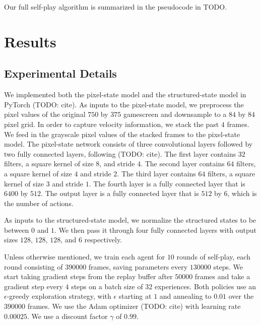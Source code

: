 \documentclass[10pt,twocolumn,letterpaper]{article}
\begin{document}
Our full self-play algorithm is summarized in the pseudocode in TODO.

\section{Results}

\subsection{Experimental Details}
We implemented both the pixel-state model and the structured-state model in
PyTorch (TODO: cite). As inputs to the pixel-state model, we preprocess the
pixel values of the original $750$ by $375$ gamescreen and downsample to a
$84$ by $84$ pixel grid. In order to capture velocity information, we stack
the past $4$ frames. We feed in the grayscale pixel values of the stacked
frames to the pixel-state model. The pixel-state network consists of three
convolutional layers followed by two fully connected layers, following (TODO:
cite). The first layer contains $32$ filters, a square kernel of size $8$, and
stride $4$. The second layer contains $64$ filters, a square kernel of size
$4$ and stride $2$. The third layer contains $64$ filters, a square kernel of
size $3$ and stride $1$. The fourth layer is a fully connected layer that is
$6400$ by $512$. The output layer is a fully connected layer that is $512$ by
$6$, which is the number of actions.

As inputs to the structured-state model, we normalize the structured states to
be between $0$ and $1$. We then pass it through four fully connected layers
with output sizes $128$, $128$, $128$, and $6$ respectively.

Unless otherwise mentioned, we train each agent for $10$ rounds of self-play,
each round consisting of $390000$ frames, saving parameters every $130000$
steps. We start taking gradient steps from the replay buffer after $50000$
frames and take a gradient step every $4$ steps on a batch size of $32$
experiences. Both policies use an $\epsilon$-greedy exploration strategy, with
$\epsilon$ starting at $1$ and annealing to $0.01$ over the $390000$ frames.
We use the Adam optimizer (TODO: cite) with learning rate $0.00025$. We use a
discount factor $\gamma$ of $0.99$.
\end{document}
